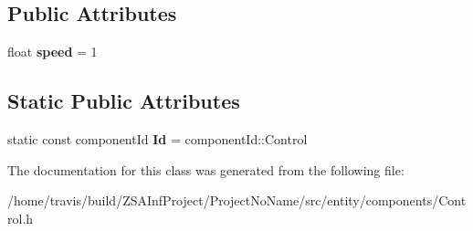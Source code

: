 \subsection*{Public Attributes}
\begin{DoxyCompactItemize}
\item 
\hypertarget{classControlComponent_a22dc0dc5b37b679770150a5b2a9ba96e}{float {\bfseries speed} = 1}\label{classControlComponent_a22dc0dc5b37b679770150a5b2a9ba96e}

\end{DoxyCompactItemize}
\subsection*{Static Public Attributes}
\begin{DoxyCompactItemize}
\item 
\hypertarget{classControlComponent_a1a98a2363b43b0c7022474bcca912ce0}{static const component\-Id {\bfseries Id} = component\-Id\-::\-Control}\label{classControlComponent_a1a98a2363b43b0c7022474bcca912ce0}

\end{DoxyCompactItemize}


The documentation for this class was generated from the following file\-:\begin{DoxyCompactItemize}
\item 
/home/travis/build/\-Z\-S\-A\-Inf\-Project/\-Project\-No\-Name/src/entity/components/Control.\-h\end{DoxyCompactItemize}
